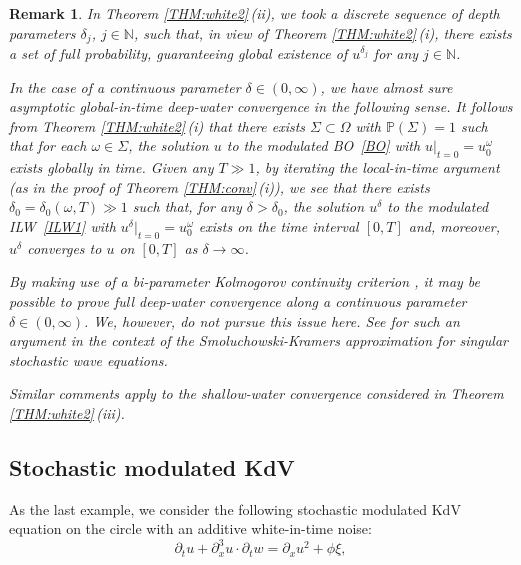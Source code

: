 \documentclass[letterpaper, 11pt,  reqno]{amsart}
\newtheorem{remark}[theorem]{Remark}
\newcommand{\1}{\hspace{0.5mm}\text{I}\hspace{0.5mm}}
\newcommand{\PP}{\mathbb{P}}
\newcommand{\dl}{\delta}
\newcommand{\Si}{\Sigma}
\newcommand{\dx}{\partial_x}
\newcommand{\dt}{\partial_t}
\renewcommand{\o}{\omega}
\renewcommand{\O}{\Omega}
\newcommand{\N}{\mathbb{N}}
\numberwithin{equation}{section}
\numberwithin{theorem}{section}
\begin{document}
\begin{remark}\rm
In Theorem \ref{THM:white2}\,(ii), 
we took a discrete sequence of depth parameters $\dl_j$, $j \in \N$,  
such that, in view of  
Theorem \ref{THM:white2}\,(i), 
there exists a set of full probability, 
guaranteeing global existence of 
$u^{\dl_j}$ for any  $j \in \N$.


In the case of  a continuous parameter $\dl \in (0, \infty)$, 
we have  almost sure asymptotic  global-in-time deep-water convergence
in the following sense.
It follows from Theorem \ref{THM:white2}\,(i)
that there exists  $\Si \subset \O$ with $\PP(\Si) = 1$
such that for each $\o \in \Si$, 
the solution $u$ 
to the modulated BO~\eqref{BO}
with $u|_{t= 0} = u_0^\o$
exists globally in time.
Given any $T \gg 1$, by iterating the local-in-time argument
(as in the proof of Theorem \ref{THM:conv}\,(i)), 
we see that there exists $\dl_ 0 = \dl_0(\o, T) \gg 1$
such that, for any $\dl > \dl_0$,  
the solution $u^{\dl}$ 
to the modulated ILW~\eqref{ILW1}
with $u^{\dl}|_{t= 0} = u_0^\o$
exists on the time interval $[0, T]$
and, moreover, $u^\dl$ converges to $u$ on $[0, T]$ as $\dl \to \infty$.


By making use of 
a bi-parameter Kolmogorov continuity criterion
\cite[Lemma 2.1]{Baldi}, 
it may be possible to prove full deep-water convergence
along a continuous parameter $\dl \in (0, \infty)$.
We, however, do not pursue this issue here.
See \cite{Zine} for such an argument
in the context of 
the Smoluchowski-Kramers approximation for singular stochastic
wave equations.


Similar comments apply to the shallow-water convergence
considered in 
 Theorem \ref{THM:white2}\,(iii).






\end{remark}







\subsection{Stochastic modulated KdV}
\label{SUBSEC:1.6}

As the last example, 
we consider 
the following stochastic modulated KdV equation on the circle
with an additive white-in-time noise:
\begin{equation}
\label{skdv1}
\dt u+  \dx^3 u \cdot \dt w =\dx u^2 + \phi \xi, 
\end{equation}
\end{document}

